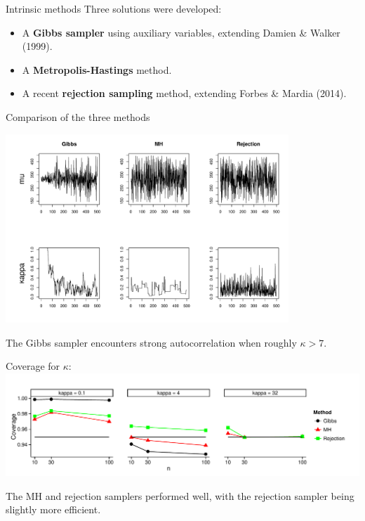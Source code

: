 \documentclass[final]{beamer}
\begin{document}
\begin{frame}
\begin{textblock}{26.5}
\begin{block}{Intrinsic methods}
Three solutions were developed:
\begin{itemize}
\item A \textbf{Gibbs sampler} using auxiliary variables, extending Damien \& Walker (1999).
\item A \textbf{Metropolis-Hastings} method.
\item A recent \textbf{rejection sampling} method, extending Forbes \& Mardia (2014).
\end{itemize}
\end{block}

\vspace{\TPHorizModule}

\begin{block}{Comparison of the three methods}
\begin{center}
\includegraphics[width=0.8\textwidth, trim = 1.3cm 1.5cm 0cm 0.5cm, clip]{ExampleRun.pdf}
\end{center}

The Gibbs sampler encounters strong autocorrelation when roughly $\kappa > 7.$ 

Coverage for $\kappa:$
\includegraphics[width=\textwidth]{CoveragesWide.pdf}

The MH and rejection samplers performed well, with the rejection sampler being slightly more efficient.  


\end{block}
\end{textblock}
\end{frame}
\end{document}
